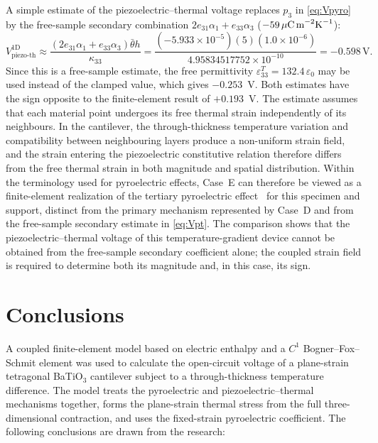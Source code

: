 \documentclass[a4paper,12pt]{elsarticle}
\begin{document}
A simple estimate of the piezoelectric--thermal voltage replaces $p_3$ in
\eqref{eq:Vpyro} by the free-sample secondary combination
$2e_{31}\alpha_1+e_{33}\alpha_3$
($-59\,\mu\text{C\,m}^{-2}\text{K}^{-1}$):
{\small
\begin{equation}
V_{\mathrm{piezo\text{-}th}}^{\mathrm{1D}}
\approx
\frac{(2e_{31}\alpha_1+e_{33}\alpha_3)\bar\theta h}{\kappa_{33}}
=
\frac{(-5.933\times10^{-5})(5)(1.0\times10^{-6})}
{4.95834517752\times10^{-10}}
=-0.598\,\text{V}.
\label{eq:Vpt}
\end{equation}
}
Since this is a free-sample estimate, the free permittivity
$\varepsilon_{33}^T=132.4\,\varepsilon_0$ may be used instead of the clamped value,
which gives $-0.253$~V. Both estimates have the sign opposite to the finite-element
result of $+0.193$~V. The estimate assumes that each material point undergoes its
free thermal strain independently of its neighbours. In the cantilever, the
through-thickness temperature variation and compatibility between neighbouring
layers produce a non-uniform strain field, and the strain
entering the piezoelectric constitutive relation therefore differs from the free
thermal strain in both magnitude and spatial distribution. Within the terminology
used for pyroelectric effects, Case~E can therefore be viewed as a
finite-element realization of the tertiary pyroelectric effect~\cite{Lang2005Pyro} for this specimen and support, distinct from the primary
mechanism represented by Case~D and from the free-sample secondary estimate in
\eqref{eq:Vpt}. The comparison shows that the piezoelectric--thermal voltage of this
temperature-gradient device cannot be obtained from the free-sample secondary
coefficient alone; the coupled strain field is required to determine both its
magnitude and, in this case, its sign.

\section{Conclusions}
\label{sec:conclusions}

A coupled finite-element model based on electric enthalpy and a $C^1$ Bogner--Fox--Schmit
element was used to calculate the open-circuit voltage of a plane-strain tetragonal BaTiO$_3$
cantilever subject to a through-thickness temperature difference. The model treats the
pyroelectric and piezoelectric--thermal mechanisms together, forms the plane-strain thermal
stress from the full three-dimensional contraction, and uses the fixed-strain pyroelectric
coefficient. The following conclusions are drawn from the research:
\end{document}
